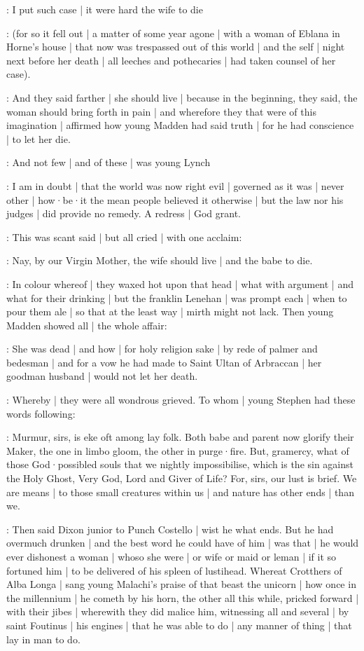 \madden:
I put such case |
it were hard the wife to die

:
(for so it fell out |
a matter of some year agone |
with a woman of Eblana in Horne's house |
that now was trespassed out of this world |
and the self |
night next before her death |
all leeches and pothecaries |
had taken counsel of her case).

:
And they said farther |
she should live |
because in the beginning,
they said,
the woman should bring forth in pain |
and wherefore they that were of this imagination |
affirmed how young Madden had said truth |
for he had conscience |
to let her die.

:
And not few |
and of these |
was young Lynch

\lynch:
I am in doubt |
that the world was now right evil |
governed as it was |
never other |
how·be·it the mean people believed it otherwise |
but the law nor his judges |
did provide no remedy.
A redress |
God grant.

:
This was scant said |
but all cried |
with one acclaim:

\All:
Nay,
by our Virgin Mother,
the wife should live |
and the babe to die.

:
In colour whereof |
they waxed hot upon that head |
what with argument |
and what for their drinking |
but the franklin Lenehan |
was prompt each |
when to pour them ale |
so that at the least way |
mirth might not lack.
Then young Madden showed all |
the whole affair:

\madden:
She was dead |
and how |
for holy religion sake |
by rede of palmer and bedesman |
and for a vow he had made to Saint Ultan of Arbraccan |
her goodman husband |
would not let her death.

:
Whereby |
they were all wondrous grieved.
To whom |
young Stephen had these words following:

\stephen:
Murmur,
sirs,
is eke oft among lay folk.
Both babe and parent now glorify their Maker,
the one in limbo gloom,
the other in purge·fire.
But,
gramercy,
what of those God·possibled souls that we nightly impossibilise,
which is the sin against the Holy Ghost,
Very God,
Lord and Giver of Life?
For,
sirs,
our lust is brief.
We are means |
to those small creatures within us |
and nature has other ends |
than we.

:
Then said Dixon junior to Punch Costello |
wist he what ends.
But he had overmuch drunken |
and the best word he could have of him |
was that |
he would ever dishonest a woman |
whoso she were |
or wife or maid or leman |
if it so fortuned him |
to be delivered of his spleen of lustihead.
Whereat Crotthers of Alba Longa |
sang young Malachi's praise of that beast the unicorn |
how once in the millennium |
he cometh by his horn,
the other all this while,
pricked forward |
with their jibes |
wherewith they did malice him,
witnessing all and several |
by saint Foutinus |
his engines |
that he was able to do |
any manner of thing |
that lay in man to do.

